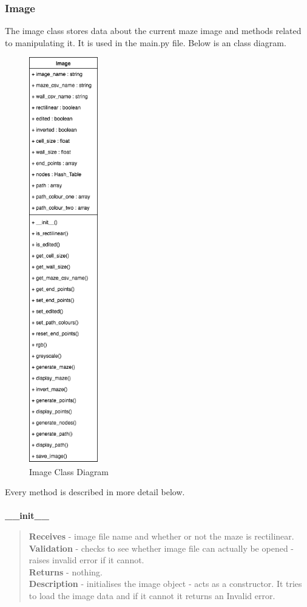 \documentclass[titlepage]{article}
\begin{document}
\subsubsection{Image}
The image class stores data about the current maze image and methods related to manipulating it. It is used in the main.py file. Below is an class diagram.

\begin{figure}[H]
  \centering
  \includegraphics[width=3cm]{Imagecd.png}
  \caption{Image Class Diagram}
  \label{fig:dijk}
\end{figure}

Every method is described in more detail below. \\\\
\textbf{\_\_init\_\_}
\begin{quote}
\textbf{Receives} - image file name and whether or not the maze is rectilinear.
\\
\textbf{Validation} - checks to see whether image file can actually be opened - raises invalid error if it cannot.\\
\textbf{Returns} - nothing.
\\
\textbf{Description} - initialises the image object - acts as a constructor. It tries to load the image data and if it cannot it returns an Invalid error.
\end{quote}
\end{document}

